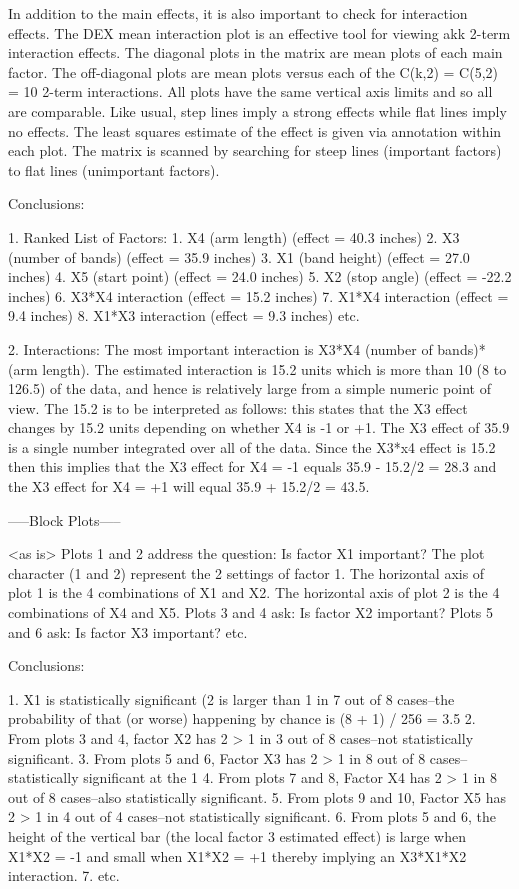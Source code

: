 In addition to the main effects, it is also
important to check for interaction effects.  The
DEX mean interaction plot is an effective tool for
viewing akk 2-term interaction effects.  The
diagonal plots in the matrix are mean plots of each
main factor.  The off-diagonal plots are mean plots
versus each of the C(k,2) = C(5,2) = 10 2-term
interactions.  All plots have the same vertical axis
limits and so all are comparable.  Like usual, step
lines imply a strong effects while flat lines imply no
effects.  The least squares estimate of the effect is
given via annotation within each plot.  The matrix is
scanned by searching for steep lines (important
factors) to flat lines (unimportant factors).

Conclusions:

   1. Ranked List of Factors:
      1. X4  (arm length)      (effect =  40.3 inches)
      2. X3  (number of bands) (effect =  35.9 inches)
      3. X1  (band height)     (effect =  27.0 inches)
      4. X5  (start point)     (effect =  24.0 inches)
      5. X2  (stop angle)      (effect = -22.2 inches)
      6. X3*X4 interaction     (effect =  15.2 inches)
      7. X1*X4 interaction     (effect =   9.4 inches)
      8. X1*X3 interaction     (effect =   9.3 inches)
      etc.

   2. Interactions:  The most important interaction is X3*X4
      (number of bands)*(arm length).  The estimated interaction
      is 15.2 units which is more than 10%
      (8 to 126.5) of the data, and hence is relatively large from
      a simple numeric point of view.  The 15.2 is to be interpreted
      as follows: this states that the X3 effect changes by 15.2
      units depending on whether X4 is -1 or +1.  The X3 effect of
      35.9 is a single number integrated over all of the data.
      Since the X3*x4 effect is 15.2 then this implies that the
      X3 effect for X4 = -1 equals 35.9 - 15.2/2 = 28.3 and
      the X3 effect for X4 = +1 will equal 35.9 + 15.2/2 = 43.5.

-----Block Plots-----

<as is>
Plots 1 and 2 address the question: Is factor X1 important?
The plot character (1 and 2) represent the 2 settings of factor 1.
The horizontal axis of plot 1 is the 4 combinations of X1 and X2.
The horizontal axis of plot 2 is the 4 combinations of X4 and X5.
Plots 3 and 4 ask: Is factor X2 important?
Plots 5 and 6 ask: Is factor X3 important?  etc.

Conclusions:

1. X1 is statistically significant (2 is larger than 1
   in 7 out of 8 cases--the probability of that (or worse)
   happening by chance is (8 + 1) / 256 = 3.5%
2. From plots 3 and 4, factor X2 has 2 > 1 in 3 out of
   8 cases--not statistically significant.
3. From plots 5 and 6, Factor X3 has 2 > 1 in 8 out of 8
   cases--statistically significant at the 1%
4. From plots 7 and 8, Factor X4 has 2 > 1 in 8 out of 8
   cases--also statistically significant.
5. From plots 9 and 10, Factor X5 has 2 > 1 in 4 out of 4
   cases--not statistically significant.
6. From plots 5 and 6, the height of the vertical bar
   (the local factor 3 estimated effect) is large
   when X1*X2 = -1 and small when X1*X2 = +1 thereby
   implying an X3*X1*X2 interaction.
7. etc.

